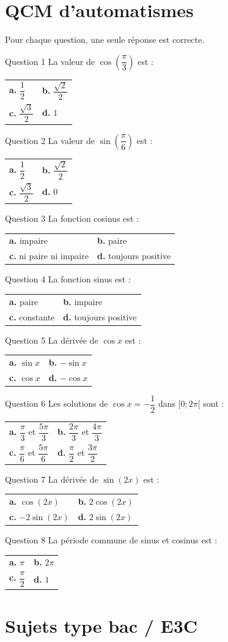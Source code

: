 \documentclass[11pt,a4paper]{article}
\makeatletter
\newcounter{question}
\newcommand{\qcm}[4]{%
\begin{center}\begin{tabularx}{0.96\linewidth}{@{}XX@{}}
\textbf{a.} #1 & \textbf{b.} #2\\[1mm]
\textbf{c.} #3 & \textbf{d.} #4
\end{tabularx}\end{center}}
\makeatother
\begin{document}
\section*{QCM d’automatismes}
Pour chaque question, une seule réponse est correcte.
\begin{correctionbox}{Question 1}
La valeur de $\cos\left(\dfrac{\pi}{3}\right)$ est :
\qcm{$\dfrac12$}{$\dfrac{\sqrt2}{2}$}{$\dfrac{\sqrt3}{2}$}{$1$}
\end{correctionbox}
\begin{correctionbox}{Question 2}
La valeur de $\sin\left(\dfrac{\pi}{6}\right)$ est :
\qcm{$\dfrac12$}{$\dfrac{\sqrt2}{2}$}{$\dfrac{\sqrt3}{2}$}{$0$}
\end{correctionbox}
\begin{correctionbox}{Question 3}
La fonction cosinus est :
\qcm{impaire}{paire}{ni paire ni impaire}{toujours positive}
\end{correctionbox}
\begin{correctionbox}{Question 4}
La fonction sinus est :
\qcm{paire}{impaire}{constante}{toujours positive}
\end{correctionbox}
\begin{correctionbox}{Question 5}
La dérivée de $\cos x$ est :
\qcm{$\sin x$}{$-\sin x$}{$\cos x$}{$-\cos x$}
\end{correctionbox}
\begin{correctionbox}{Question 6}
Les solutions de $\cos x=-\dfrac12$ dans $[0;2\pi[$ sont :
\qcm{$\dfrac{\pi}{3}$ et $\dfrac{5\pi}{3}$}{$\dfrac{2\pi}{3}$ et $\dfrac{4\pi}{3}$}{$\dfrac{\pi}{6}$ et $\dfrac{5\pi}{6}$}{$\dfrac{\pi}{2}$ et $\dfrac{3\pi}{2}$}
\end{correctionbox}
\begin{correctionbox}{Question 7}
La dérivée de $\sin(2x)$ est :
\qcm{$\cos(2x)$}{$2\cos(2x)$}{$-2\sin(2x)$}{$2\sin(2x)$}
\end{correctionbox}
\begin{correctionbox}{Question 8}
La période commune de sinus et cosinus est :
\qcm{$\pi$}{$2\pi$}{$\dfrac{\pi}{2}$}{$1$}
\end{correctionbox}

\section*{Sujets type bac / E3C}
\end{document}
